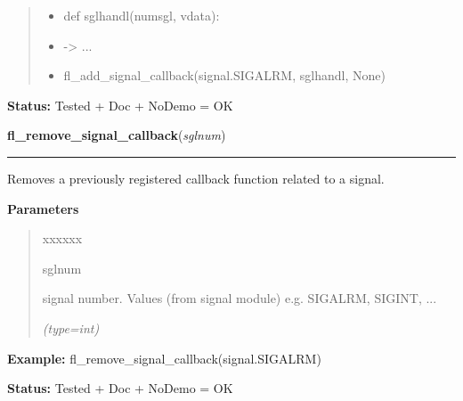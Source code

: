 \begin{boxedminipage}{\funcwidth}
\begin{quote}
\begin{itemize}
  \item
    \setlength{\parskip}{0.6ex}
def sglhandl(numsgl, vdata):



  \item {\textbar}-{\textgreater}{\textbar} ...



  \item fl\_add\_signal\_callback(signal.SIGALRM, sglhandl, None)



\end{itemize}

\end{quote}

\textbf{Status:} Tested + Doc + NoDemo = OK



    \end{boxedminipage}

    \label{xformslib:flbasic:fl_remove_signal_callback}

    \vspace{0.5ex}

\hspace{.8\funcindent}\begin{boxedminipage}{\funcwidth}

    \raggedright \textbf{fl\_remove\_signal\_callback}(\textit{sglnum})

    \vspace{-1.5ex}

    \rule{\textwidth}{0.5\fboxrule}
\setlength{\parskip}{2ex}
    Removes a previously registered callback function related to a signal.

\setlength{\parskip}{1ex}
      \textbf{Parameters}
      \vspace{-1ex}

      \begin{quote}
        \begin{Ventry}{xxxxxx}

          \item[sglnum]

          signal number. Values (from signal module) e.g. SIGALRM, SIGINT, 
          ...

            {\it (type=int)}

        \end{Ventry}

      \end{quote}

\textbf{Example:} fl\_remove\_signal\_callback(signal.SIGALRM)



\textbf{Status:} Tested + Doc + NoDemo = OK



    \end{boxedminipage}

